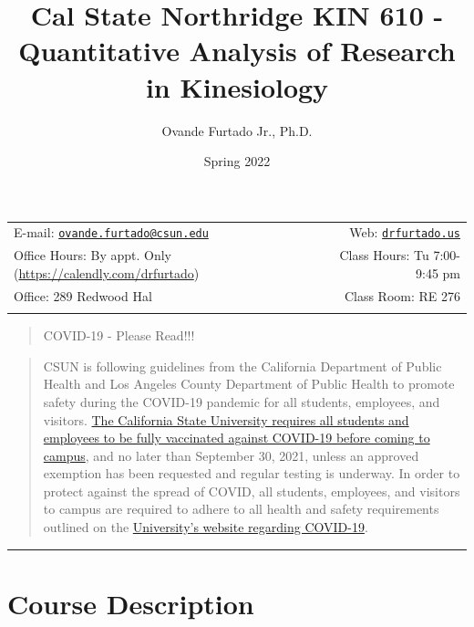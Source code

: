 \documentclass[11pt,]{article}
\title{Cal State Northridge \textbar{} KIN 610 - Quantitative Analysis
of Research in Kinesiology}
\author{Ovande Furtado Jr., Ph.D.}
\date{Spring 2022}
\begin{document}
  

		\maketitle
		
	
		\thispagestyle{firststyle}



	\noindent \begin{tabular*}{\textwidth}{ @{\extracolsep{\fill}} lr @{\extracolsep{\fill}}}


E-mail: \texttt{\href{mailto:ovande.furtado@csun.edu}{\nolinkurl{ovande.furtado@csun.edu}}} & Web: \href{http://drfurtado.us}{\tt drfurtado.us}\\
Office Hours: By appt. Only
(\url{https://calendly.com/drfurtado})  &  Class Hours: Tu 7:00-9:45
pm\\
Office: 289 Redwood Hal  & Class Room: RE 276\\
	&  \\
	\hline
	\end{tabular*}
	
\vspace{2mm}
	


\begin{quote}
COVID-19 - Please Read!!!
\end{quote}

\begin{quote}
CSUN is following guidelines from the California Department of Public
Health and Los Angeles County Department of Public Health to promote
safety during the COVID-19 pandemic for all students, employees, and
visitors.
\href{http://www.csun.edu/ua/email/NCpages/0813_student_vaccination.html}{The
California State University requires all students and employees to be
fully vaccinated against COVID-19 before coming to campus}, and no later
than September 30, 2021, unless an approved exemption has been requested
and regular testing is underway. In order to protect against the spread
of COVID, all students, employees, and visitors to campus are required
to adhere to all health and safety requirements outlined on the
\href{https://www.csun.edu/matadors-forward/health-and-safety}{University's
website regarding COVID-19}.
\end{quote}

\begin{center}\rule{0.5\linewidth}{0.5pt}\end{center}

\hypertarget{course-description}{%
\section{Course Description}\label{course-description}}
\end{document}
